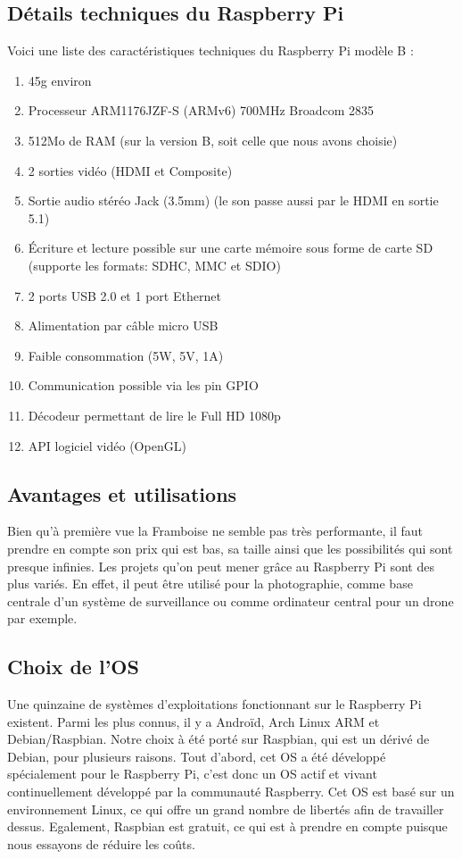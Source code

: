 \documentclass[a4paper,11pt]{report}
\begin{document}
{\subsection{Détails techniques du Raspberry Pi}
Voici une liste des caractéristiques techniques du Raspberry Pi modèle B \cite{RaspberryPiCaracteristiques}:
\begin{enumerate}
\item 45g environ
\item Processeur ARM1176JZF-S (ARMv6) 700MHz Broadcom 2835
\item 512Mo de RAM (sur la version B, soit celle que nous avons choisie)
\item 2 sorties vidéo (HDMI et Composite) 
\item Sortie audio stéréo Jack (3.5mm) (le son passe aussi par le HDMI en sortie 5.1)
\item Écriture et lecture possible sur une carte mémoire sous forme de carte SD (supporte les formats: SDHC, MMC et SDIO)
\item 2 ports USB 2.0 et 1 port Ethernet
\item Alimentation par câble micro USB
\item Faible consommation (5W, 5V, 1A)
\item Communication possible via les pin GPIO
\item Décodeur permettant de lire le Full HD  1080p
\item API logiciel vidéo (OpenGL)
\end{enumerate}

\subsection{Avantages et utilisations}
Bien qu'à première vue la Framboise ne semble pas très performante, il faut prendre en compte son prix qui est bas, sa taille ainsi que les possibilités qui sont presque infinies. Les projets qu'on peut mener grâce au Raspberry Pi sont des plus variés. En effet, il peut être utilisé pour la photographie, comme base centrale d'un système de surveillance ou comme ordinateur central pour un drone par exemple.

\subsection{Choix de l'OS}
Une quinzaine de systèmes d'exploitations fonctionnant sur le Raspberry Pi existent. Parmi les plus connus, il y a Androïd, Arch Linux ARM et Debian/Raspbian. 
Notre choix à été porté sur Raspbian, qui est un dérivé de Debian, pour plusieurs raisons. Tout d'abord, cet OS a été développé spécialement pour le Raspberry Pi, c'est donc un OS actif et vivant continuellement développé par la communauté Raspberry. Cet OS est basé sur un environnement Linux, ce qui offre un grand nombre de libertés afin de travailler dessus. Egalement, Raspbian est gratuit, ce qui est à prendre en compte puisque nous essayons de réduire les coûts.  

}
\end{document}
